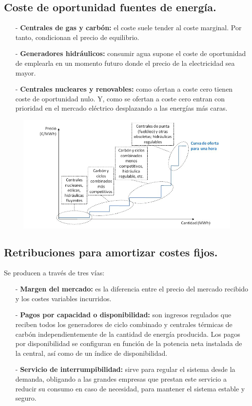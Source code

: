 \subsection{Coste de oportunidad fuentes de energía.}
\begin{itemize}
	\item [-]\textbf{Centrales de gas y carbón:} el coste suele tender al coste marginal. Por tanto, condicionan el precio de equilibrio. 
	\item [-]\textbf{Generadores hidráulicos:} consumir agua supone el coste de oportunidad de emplearla en un momento futuro donde el precio de la electricidad sea mayor.
	\item [-]\textbf{Centrales nucleares y renovables:} como ofertan a coste cero tienen coste de oportunidad nulo. Y, como se ofertan a coste cero entran con prioridad en el mercado eléctrico desplazando a las energías más caras.
\end{itemize}
\begin{figure}[H]
	\centering
	\includegraphics[width=0.7\linewidth]{res/tema4/curvaDemanda}
	\label{fig:curvademanda}
\end{figure}
\subsection{Retribuciones para amortizar costes fijos.}
Se producen a través de tres vías:
\begin{itemize}
	\item [-]\textbf{Margen del mercado:} es la diferencia entre el precio del mercado recibido y los costes variables incurridos.
	\item [-]\textbf{Pagos por capacidad o disponibilidad:} son ingresos regulados que reciben todos los generadores de ciclo
	combinado y centrales térmicas de carbón independientemente de la cantidad de energía
	producida. Los pagos por disponibilidad se configuran en función de la potencia neta instalada de la central,
	así como de un índice de disponibilidad.
	\item [-]\textbf{Servicio de interrumpibilidad:} sirve para regular el sistema desde la demanda, obligando a las grandes empresas
	que prestan este servicio a reducir su consumo en caso de necesidad, para mantener el sistema
	estable y seguro.
\end{itemize}
